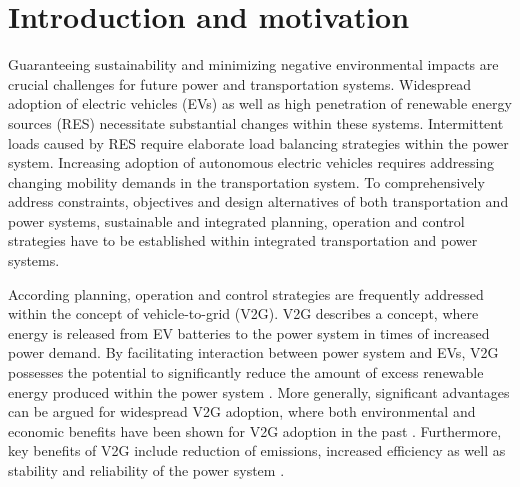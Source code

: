 \section{Introduction and motivation}

Guaranteeing sustainability and minimizing negative environmental impacts are crucial challenges for future power and transportation systems. Widespread adoption of electric vehicles (EVs) as well as high penetration of renewable energy sources (RES) necessitate substantial changes within these systems. Intermittent loads caused by RES require elaborate load balancing strategies within the power system. Increasing adoption of autonomous electric vehicles requires addressing changing mobility demands in the transportation system. To comprehensively address constraints, objectives and design alternatives of both transportation and power systems, sustainable and integrated planning, operation and control strategies have to be established within integrated transportation and power systems.



According planning, operation and control strategies are frequently addressed within the concept of vehicle-to-grid (V2G). V2G describes a concept, where energy is released from EV batteries to the power system in times of increased power demand.  By facilitating interaction between power system and EVs, V2G possesses the potential to significantly reduce the amount of excess renewable energy produced within the power system \cite{richardson2013electric}. More generally, significant advantages can be argued for widespread V2G adoption, where both environmental and economic benefits have been shown for V2G adoption in the past \cite{richardson2013electric, faria2012sustainability, mwasilu2014electric}. Furthermore, key benefits of V2G include reduction of emissions, increased efficiency as well as stability and reliability of the power system \cite{yilmaz2013review}.


